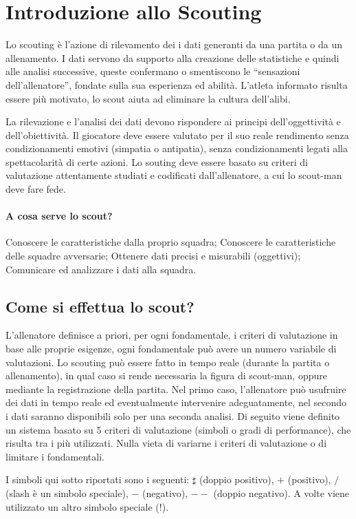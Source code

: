 \chapter{Introduzione allo Scouting}

Lo scouting è l'azione di rilevamento dei i dati generanti da una partita o da un allenamento.
I dati servono da supporto alla creazione delle statistiche e quindi alle analisi successive, queste confermano o smentiscono le “sensazioni dell’allenatore”, fondate sulla sua
esperienza ed abilità.
L’atleta informato risulta essere più motivato, lo scout aiuta ad eliminare la cultura dell’alibi.

La rilevazione e l'analisi dei dati devono rispondere ai principi dell'oggettività e dell'obiettività.
Il giocatore deve essere valutato per il suo reale rendimento senza condizionamenti emotivi (simpatia o antipatia), senza condizionamenti legati alla spettacolarità di certe azioni.
Lo souting deve essere basato su criteri di valutazione attentamente studiati e codificati dall'allenatore, a cui lo scout-man deve fare fede.

\subsubsection{A cosa serve lo scout?}
Conoscere le caratteristiche dalla proprio squadra;
Conoscere le caratteristiche delle squadre avversarie;
Ottenere dati precisi e misurabili (oggettivi);
Comunicare ed analizzare i dati alla squadra.

\section{Come si effettua lo scout?}
L'allenatore definisce a priori, per ogni fondamentale, i criteri di valutazione in base alle proprie esigenze, ogni fondamentale può avere un numero variabile di valutazioni.
Lo scouting può essere fatto in tempo reale (durante la partita o allenamento), in qual caso si rende necessaria la figura di scout-man, oppure mediante la registrazione della partita.
Nel primo caso, l'allenatore può usufruire dei dati in tempo reale ed eventualmente intervenire adeguatamente, nel secondo i dati saranno disponibili solo per una seconda analisi.
Di seguito viene definito un sistema basato su 5 criteri di valutazione (simboli o gradi di performance), che risulta tra i più utilizzati. Nulla vieta di variarne i criteri di valutazione o di limitare i fondamentali.

I simboli qui sotto riportati sono i seguenti: $\sharp$ (doppio positivo), $+$ (positivo),
$/$ (slash è un simbolo speciale), $-$ (negativo), $--$ (doppio negativo). A volte viene utilizzato
un altro simbolo speciale ($!$).

